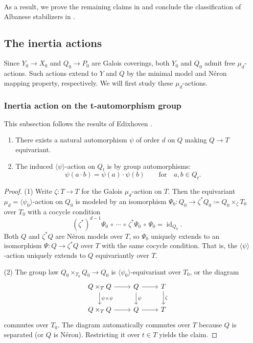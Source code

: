 \documentclass[reqno, letterpaper]{amsart}
\numberwithin{equation}{subsection}
\let\to\longrightarrow
\DeclareMathOperator{\id}{id}
\begin{document}
	As a result, we prove the remaining claims in  and conclude the classification of Albanese stabilizers in .
	
	
	
	\subsection{The inertia actions} \label{sec:inertia action}
		Since $Y_0 \to X_0$ and $Q_0 \to P_0$ are Galois coverings, both $Y_0$ and $Q_0$ admit free $\mu_d$-actions. Such actions extend to $Y$ and $Q$ by the minimal model and N\'eron mapping property, respectively. We will first study these $\mu_d$-actions.
		
		
		
		\subsubsection{Inertia action on the t-automorphism group}
			This subsection follows the results of Edixhoven \cite{edi92}.
			
			\begin{proposition} \label{prop:psi-action}
				\begin{enumerate}
					\item There exists a natural automorphism $\psi$ of order $d$ on $Q$ making $Q \to T$ equivariant.
					\item The induced $\langle \psi \rangle$-action on $Q_t$ is by group automorphisms:
					\[ \psi(a \cdot b) = \psi(a) \cdot \psi(b) \qquad\mbox{for}\quad a, b \in Q_t .\]
				\end{enumerate}
			\end{proposition}
			\begin{proof}
				(1) Write $\zeta : T \to T$ for the Galois $\mu_d$-action on $T$. Then the equivariant $\mu_d = \langle \psi_0 \rangle$-action on $Q_0$ is modeled by an isomorphism $\Psi_0 : Q_0 \to \zeta^* Q_0 \coloneq Q_0 \times_{\zeta} T_0$ over $T_0$ with a cocycle condition
				\[ (\zeta^*)^{d-1} \Psi_0 \,\circ\, \cdots \,\circ\, \zeta^* \Psi_0 \,\circ\, \Psi_0 = \id_{Q_0} .\]
				Both $Q$ and $\zeta^* Q$ are N\'eron models over $T$, so $\Psi_0$ uniquely extends to an isomorphism $\Psi : Q \to \zeta^* Q$ over $T$ with the same cocycle condition. That is, the $\langle \psi \rangle$-action uniquely extends to $Q$ equivariantly over $T$.
				
				\medskip
				
				(2) The group law $Q_0 \times_{T_0} Q_0 \to Q_0$ is $\langle \psi_0 \rangle$-equivariant over $T_0$, or the diagram
				\[\begin{tikzcd}
					Q \times_T Q \arrow[r] \arrow[d, "\psi \times \psi"] & Q \arrow[d, "\psi"] \arrow[r] & T \arrow[d, "\zeta"] \\
					Q \times_T Q \arrow[r] & Q \arrow[r] & T
				\end{tikzcd}\]
				commutes over $T_0$. The diagram automatically commutes over $T$ because $Q$ is separated (or $Q$ is N\'eron). Restricting it over $t \in T$ yields the claim.
			\end{proof}
			
\end{document}
